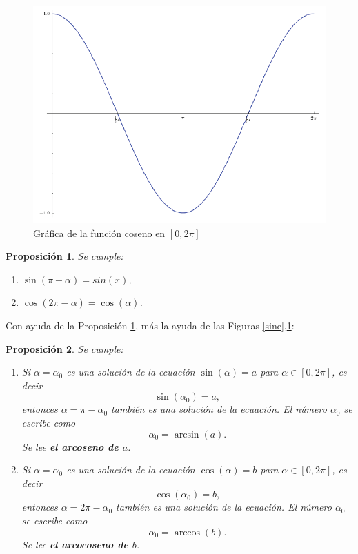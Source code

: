 \documentclass[10pt]{article}
\newcommand{\2}[1]{\hspace{-0.93cm}\colorbox{color1}{\hspace{0.07cm} \parbox{17cm}{\vspace{0.2cm} #1}\hspace*{0.07cm} }}
\newcommand{\3}[1]{\hspace{-0.93cm}\colorbox{color7}{\hspace{0.07cm} \parbox{17cm}{\vspace{0.2cm} #1}\hspace*{0.07cm} }}
\theoremstyle{theorem}
\newtheorem{pro}{Proposici\'on}%
\numberwithin{equation}{section}
\begin{document}
\begin{figure}[h!]
\centering
\includegraphics[scale=0.3]{cosine}
\caption{Gr\'afica de la funci\'on coseno en $[0,2\pi]$}
\label{cosine}
\end{figure}

\begin{pro}\label{soluciones ecua}
Se cumple:
\begin{enumerate}[1.]
   \item $\sin(\pi-\alpha)=sin(x)$,
   \item $\cos(2\pi - \alpha)=\cos(\alpha)$.
\end{enumerate}
\end{pro}
Con ayuda de la Proposici\'on \ref{soluciones ecua}, m\'as la ayuda de las Figuras \ref{sine},\ref{cosine}:

\begin{pro} Se cumple:
\begin{enumerate}[1.]
   \item Si $\alpha=\alpha_0$ es una soluci\'on de la ecuaci\'on $\sin(\alpha)=a$ para $\alpha \in [0,2\pi]$, es decir $$\sin(\alpha_0)=a,$$ entonces $\alpha=\pi-\alpha_0$ tambi\'en es una soluci\'on de la ecuaci\'on. El n\'umero $\alpha_0$ se escribe como $$\alpha_0=\arcsin(a).$$ Se lee \textbf{el arcoseno de $a$}.
   \item Si $\alpha=\alpha_0$ es una soluci\'on de la ecuaci\'on $\cos(\alpha)=b$ para $\alpha \in [0,2\pi]$, es decir $$\cos(\alpha_0)=b,$$ entonces $\alpha=2\pi-\alpha_0$ tambi\'en es una soluci\'on de la ecuaci\'on. El n\'umero $\alpha_0$ se escribe como $$\alpha_0=\arccos(b).$$ Se lee \textbf{el arcocoseno de $b$}.
\end{enumerate}
\end{pro}
\end{document}

